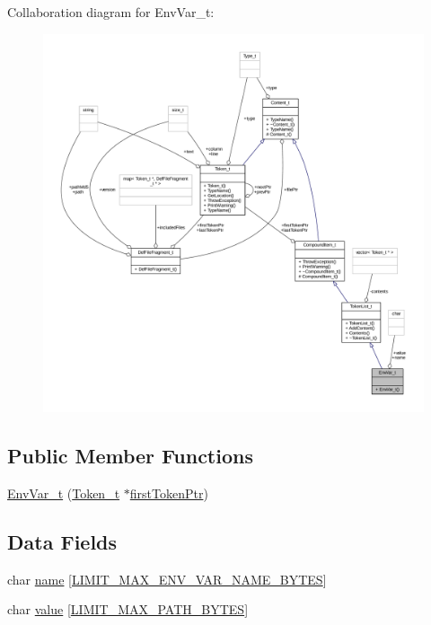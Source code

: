 Collaboration diagram for Env\+Var\+\_\+t\+:
\nopagebreak
\begin{figure}[H]
\begin{center}
\leavevmode
\includegraphics[width=350pt]{struct_env_var__t__coll__graph}
\end{center}
\end{figure}
\subsection*{Public Member Functions}
\begin{DoxyCompactItemize}
\item 
\hyperlink{struct_env_var__t_ade21aadb17794eb517b9985bfb10ff1b}{Env\+Var\+\_\+t} (\hyperlink{struct_token__t}{Token\+\_\+t} $\ast$\hyperlink{struct_compound_item__t_a4d95dc788120f627e332491589d20c5c}{first\+Token\+Ptr})
\end{DoxyCompactItemize}
\subsection*{Data Fields}
\begin{DoxyCompactItemize}
\item 
char \hyperlink{struct_env_var__t_a904d526eed0449186857b4512f0cbfe4}{name} \mbox{[}\hyperlink{limit_8h_a5a83d7a186a731c43c16ff2c2198cc53}{L\+I\+M\+I\+T\+\_\+\+M\+A\+X\+\_\+\+E\+N\+V\+\_\+\+V\+A\+R\+\_\+\+N\+A\+M\+E\+\_\+\+B\+Y\+T\+ES}\mbox{]}
\item 
char \hyperlink{struct_env_var__t_a890bd50fbcfca41f847ebe31bef43b54}{value} \mbox{[}\hyperlink{limit_8h_accd19a6264ef965c02f113dc01610e14}{L\+I\+M\+I\+T\+\_\+\+M\+A\+X\+\_\+\+P\+A\+T\+H\+\_\+\+B\+Y\+T\+ES}\mbox{]}
\end{DoxyCompactItemize}
